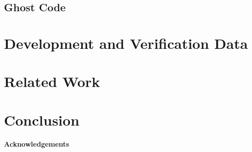 \documentclass[11pt,a4paper]{article}
\begin{document}
\subsection{Ghost Code}



\section{Development and Verification Data}

\section{Related Work}
\label{related-work}

\section{Conclusion}


\paragraph*{Acknowledgements}




\end{document}

